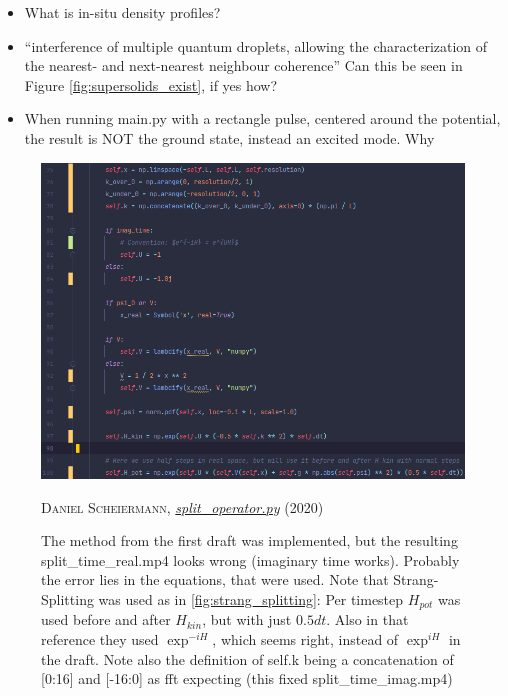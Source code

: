 \begin{itemize}
        \item What is in-situ density profiles?
        \item ``interference of multiple quantum droplets, allowing the characterization of the nearest- and next-nearest neighbour coherence'' Can this be seen in Figure \ref{fig:supersolids_exist}, if yes how?
        \item When running main.py with a rectangle pulse, centered around the potential, the result is NOT the ground state, instead an excited mode. Why

\end{itemize}


\begin{figure}[H]
    \centering
    \includegraphics[width=1.0\textwidth]{IMAGE/find_the_error.png}\\
    \caption{
      The method from the first draft was implemented, but the resulting split\_time\_real.mp4 looks wrong (imaginary time works). Probably the error lies in the equations, that were used. Note that Strang-Splitting was used as in \ref{fig:strang_splitting}: Per timestep $H_{pot}$ was used before and after $H_{kin}$, but with just $0.5dt$.
      Also in that reference they used $\exp^{-iH}$, which seems right, instead of $\exp^{iH}$ in the draft.
      Note also the definition of self.k being a concatenation of [0:16] and [-16:0] as fft expecting (this fixed split\_time\_imag.mp4)
    }
    \textsc{Daniel Scheiermann},
    \emph{\url{split_operator.py}} (2020)
    \label{fig:find_the_error}
\end{figure}


